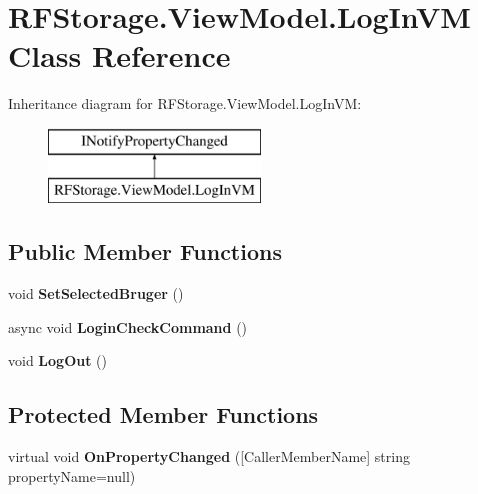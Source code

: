 \hypertarget{class_r_f_storage_1_1_view_model_1_1_log_in_v_m}{}\section{R\+F\+Storage.\+View\+Model.\+Log\+In\+VM Class Reference}
\label{class_r_f_storage_1_1_view_model_1_1_log_in_v_m}
Inheritance diagram for R\+F\+Storage.\+View\+Model.\+Log\+In\+VM\+:\begin{figure}[H]
\begin{center}
\leavevmode
\includegraphics[height=2.000000cm]{class_r_f_storage_1_1_view_model_1_1_log_in_v_m}
\end{center}
\end{figure}
\subsection*{Public Member Functions}
\begin{DoxyCompactItemize}
\item 
\mbox{\label{class_r_f_storage_1_1_view_model_1_1_log_in_v_m_a2891f59e80b62625cf4936217b1777fe}} 
void {\bfseries Set\+Selected\+Bruger} ()
\item 
\mbox{\label{class_r_f_storage_1_1_view_model_1_1_log_in_v_m_a3f82fc8d1f02be9b58238808255b0e29}} 
async void {\bfseries Login\+Check\+Command} ()
\item 
\mbox{\label{class_r_f_storage_1_1_view_model_1_1_log_in_v_m_ad6305899737df834684a7d75eea8bf24}} 
void {\bfseries Log\+Out} ()
\end{DoxyCompactItemize}
\subsection*{Protected Member Functions}
\begin{DoxyCompactItemize}
\item 
\mbox{\label{class_r_f_storage_1_1_view_model_1_1_log_in_v_m_a668fc613263a575fb30246413729bb32}} 
virtual void {\bfseries On\+Property\+Changed} (\mbox{[}Caller\+Member\+Name\mbox{]} string property\+Name=null)
\end{DoxyCompactItemize}
